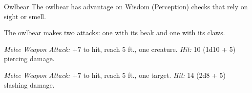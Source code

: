 \documentclass[10pt,a4paper,twoside,fancy,bg=print,twocolumn,openany,nodeprecatedcode]{dndbook}
\begin{document}
\begin{DndMonster}[float=t]{Owlbear}
\DndMonsterBasics[
armor-class = {13 (natural armor)},
hit-points = {\DndDice{7d10 + 21}},
speed = {40 ft.}
]
\DndMonsterAbilityScores[
 str = 20,
 dex = 12,
 con = 17,
 int = 3,
 wis = 12,
 cha = 7
]
\DndMonsterDetails[
skills = {Perception +3},
senses = {darkvision 60 ft., passive perception 13},
challenge = 3,
]
The owlbear has advantage on Wisdom (Perception) checks that rely on sight or smell.

The owlbear makes two attacks: one with its beak and one with its claws.

\textsl{Melee Weapon Attack:} +7 to hit, reach 5 ft., one creature. \textsl{Hit:} 10 (1d10 + 5) piercing damage.

\textsl{Melee Weapon Attack:} +7 to hit, reach 5 ft., one target. \textsl{Hit:} 14 (2d8 + 5) slashing damage.

\end{DndMonster}


\clearpage
\end{document}
